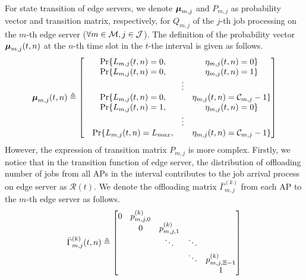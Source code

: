 {    %
    For state transition of edge servers, we denote $\boldsymbol{\mu}_{m,j}$ and $P_{m,j}$ as probability vector and transition matrix, respectively, for $Q_{m,j}$ of the $j$-th job processing on the $m$-th edge server ($\forall m\in\mathcal{M}, j\in\mathcal{J}$). The definition of the probability vector $\boldsymbol{\mu}_{m,j}(t,n)$ at the $n$-th time slot in the $t$-the interval is given as follows.
    \begin{align}
        \boldsymbol{\mu}_{m,j}(t,n) \triangleq 
        \begin{bmatrix}
            &\Pr\{L_{m,j}(t,n)=0,   &        & \eta_{m,j}(t,n)=0\} \\
            &\Pr\{L_{m,j}(t,n)=0,   &        & \eta_{m,j}(t,n)=1\} \\
            &                       & \vdots & \\
            &\Pr\{L_{m,j}(t,n)=0,   &        & \eta_{m,j}(t,n)=\mathcal{C}_{m,j}-1\} \\
            &\Pr\{L_{m,j}(t,n)=1,   &        & \eta_{m,j}(t,n)=0\} \\
            &                       & \vdots & \\
            &\Pr\{L_{m,j}(t,n)=L_{max}, &        & \eta_{m,j}(t,n)=\mathcal{C}_{m,j}-1\}
        \end{bmatrix}
    \end{align}
    However, the expression of transition matrix $P_{m,j}$ is more complex. Firstly, we notice that in the transition function of edge server, the distribution of offloading number of jobs from all APs in the interval contributes to the job arrival process on edge server as $\mathcal{R}(t)$. We denote the offloading matrix $\bar{\Gamma}^{(k)}_{m,j}$ from each AP to the $m$-th edge server as follows.
    \begin{align}
        \bar{\Gamma}^{(k)}_{m,j}(t,n) \triangleq
        \begin{bmatrix}
            0 & p^{(k)}_{m,j,0} &                 &        &                     \\
            & 0               & p^{(k)}_{m,j,1} &        &                     \\
            &                 & \ddots          & \ddots &                     \\
            &                 &                 & \ddots & p^{(k)}_{m,j,\Xi-1} \\
            &                 &                 &        & 1                   \\

\end{bmatrix}
\end{align}}
